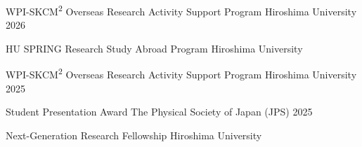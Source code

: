 
\begin{cvhonors}

  \cvhonor
    {WPI-SKCM\textsuperscript{2} Overseas Research Activity Support Program} %
    {Hiroshima University} %
    {} %
    {2026} %

  \cvhonor
    {HU SPRING Research Study Abroad Program} %
    {Hiroshima University} %
    {} %
    {} %

\end{cvhonors}

\begin{cvhonors}

  \cvhonor
    {WPI-SKCM\textsuperscript{2} Overseas Research Activity Support Program} %
    {Hiroshima University} %
    {} %
    {2025} %

  \cvhonor
    {Student Presentation Award} %
    {The Physical Society of Japan (JPS)} %
    {} %
    {2025} %

  \cvhonor
    {Next-Generation Research Fellowship} %
    {Hiroshima University} %
    {} %
    {} %

\end{cvhonors}